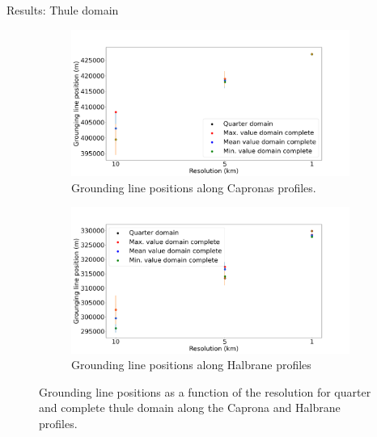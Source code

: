 \documentclass[11pt]{beamer}
\begin{document}
\begin{frame}[allowframebreaks]{Results: Thule domain}
\begin{figure}
				\label{Volume_THULE_VS_TIME_VS_NODES}
			\end{figure}
			\begin{figure}
				\centering
				\begin{subfigure}{.5\textwidth}
					\centering
					\includegraphics[width=1.1\linewidth]{../fig/Figure_THULE_GLpositions_Capronas.png}
					\caption{Grounding line positions along Capronas profiles.}
					\label{Thule_Capronas}
				\end{subfigure}%
				\begin{subfigure}{.5\textwidth}
					\centering
					\includegraphics[width=1.1\linewidth]{../fig/Figure_THULE_GLpositions_Halbranes.png}
					\caption{Grounding line positions along Halbrane profiles}
					\label{Thule_halbranes}
				\end{subfigure}
				\caption{Grounding line positions as a function of the resolution for quarter and complete thule domain along the Caprona and Halbrane profiles.}
				\label{Grounding_lines__caprona_halbrane_comparison}
			\end{figure}
		\end{frame}
\end{document}
